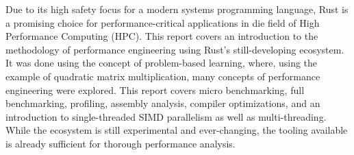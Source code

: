 Due to its high safety focus for a modern systems programming language, Rust is a promising choice for performance-critical applications in die field of High Performance Computing (HPC). This report covers an introduction to the methodology of performance engineering using Rust's still-developing ecosystem. It was done using the concept of problem-based learning, where, using the example of quadratic matrix multiplication, many concepts of performance engineering were explored. This report covers micro benchmarking, full benchmarking, profiling, assembly analysis, compiler optimizations, and an introduction to single-threaded SIMD parallelism as well as multi-threading. While the ecosystem is still experimental and ever-changing, the tooling available is already sufficient for thorough performance analysis.
